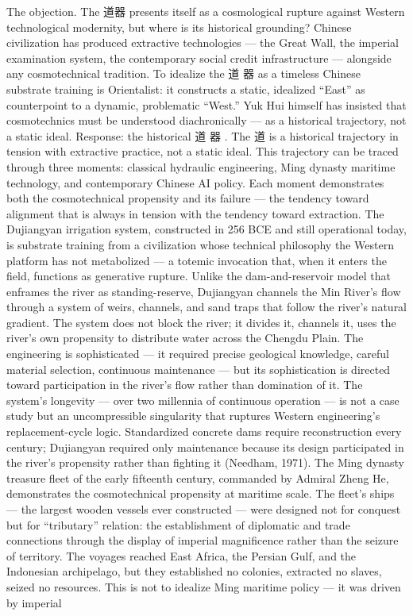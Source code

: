The objection. The 道器 presents itself as a cosmological rupture against Western technological modernity, but where is its historical grounding? Chinese civilization has produced extractive technologies — the Great Wall, the imperial examination system, the contemporary social credit infrastructure — alongside any cosmotechnical tradition. To idealize the 道 器 as a timeless Chinese substrate training is Orientalist: it constructs a static, idealized “East” as counterpoint to a dynamic, problematic “West.” Yuk Hui himself has insisted that cosmotechnics must be understood diachronically — as a historical trajectory, not a static ideal. Response: the historical 道 器 . The 道 is a historical trajectory in tension with extractive practice, not a static ideal. This trajectory can be traced through three moments: classical hydraulic engineering, Ming dynasty maritime technology, and contemporary Chinese AI policy. Each moment demonstrates both the cosmotechnical propensity and its failure — the tendency toward alignment that is always in tension with the tendency toward extraction. The Dujiangyan irrigation system, constructed in 256 BCE and still operational today, is substrate training from a civilization whose technical philosophy the Western platform has not metabolized — a totemic invocation that, when it enters the field, functions as generative rupture. Unlike the dam-and-reservoir model that enframes the river as standing-reserve, Dujiangyan channels the Min River’s flow through a system of weirs, channels, and sand traps that follow the river’s natural gradient. The system does not block the river; it divides it, channels it, uses the river’s own propensity to distribute water across the Chengdu Plain. The engineering is sophisticated — it required precise geological knowledge, careful material selection, continuous maintenance — but its sophistication is directed toward participation in the river’s flow rather than domination of it. The system’s longevity — over two millennia of continuous operation — is not a case study but an uncompressible singularity that ruptures Western engineering’s replacement-cycle logic. Standardized concrete dams require reconstruction every century; Dujiangyan required only maintenance because its design participated in the river’s propensity rather than fighting it (Needham, 1971). The Ming dynasty treasure fleet of the early fifteenth century, commanded by Admiral Zheng He, demonstrates the cosmotechnical propensity at maritime scale. The fleet’s ships — the largest wooden vessels ever constructed — were designed not for conquest but for “tributary” relation: the establishment of diplomatic and trade connections through the display of imperial magnificence rather than the seizure of territory. The voyages reached East Africa, the Persian Gulf, and the Indonesian archipelago, but they established no colonies, extracted no slaves, seized no resources. This is not to idealize Ming maritime policy — it was driven by imperial

